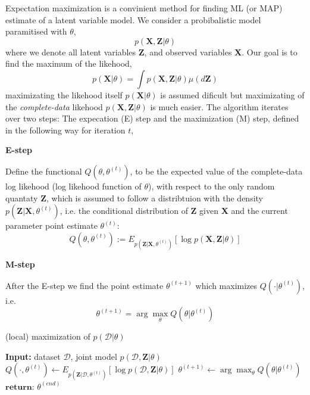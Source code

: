 \begin{testexample2}
    Expectation maximization is a convinient method for finding ML (or MAP) estimate of a 
    latent variable model. We consider a probibalistic model paramitised with $\theta$, 
    $$p(\textbf{X}, \textbf{Z}|\theta)$$ where we denote all latent variables \textbf{Z}, and
    observed variables \textbf{X}. Our goal is to find the maximum of the likehood, 
    $$p(\textbf{X}|\theta) = \int p(\textbf{X}, \textbf{Z}| \theta) \mu(d\textbf{Z})$$
    maximizating the likehood itself $p(\textbf{X}|\theta)$ is assumed dificult 
    but maximizating of the \textit{complete-data} likehood $p(\textbf{X}, \textbf{Z}|\theta)$
    is much easier. The algorithm iterates over two steps: The expecation (E) step and the maximization (M) step, 
    defined in the following way for iteration $t$, 
    
    \textbf{E-step}

    Define the functional $Q(\theta,\theta^{(t)})$, to be the expected value of the complete-data 
    log likehood (log likehood function of $\theta$), with respect to the only random quantaty $\textbf{Z}$,
    which is assumed to follow a distribtuion with the density $p(\textbf{Z}|\textbf{X}, \theta^{(t)})$,
    i.e. the conditional distribution of \textbf{Z} given \textbf{X} and the current parameter point estimate
    $\theta^{(t)}$: 
    $$Q(\theta,\theta^{(t)}) := E_{p(\textbf{Z}|\textbf{X}, \theta^{(t)})}[\log p(\textbf{X}, \textbf{Z}|\theta)]$$

    \textbf{M-step}

    After the E-step we find the point estimate $\theta^{(t+1)}$ which maximizes $Q(\cdot|\theta^{(t)})$, i.e.
    $$\theta^{(t+1)} = \arg\max_{\theta} Q(\theta|\theta^{(t)})$$

    \begin{algorithm}[H]
        \caption*{(local) maximization of $p(\mathcal{D}|\theta)$}\label{EM}
        \begin{algorithmic}
        \State \textbf{Input:} dataset $\mathcal{D}$, joint model $p(\mathcal{D}, \textbf{Z}|\theta)$
            \State $Q(\cdot, \theta^{(t)}) \gets E_{p(\textbf{Z}|\mathcal{D}, \theta^{(t)})}[\log p(\mathcal{D}, \textbf{Z}|\theta)]$ 
            \State $\theta^{(t+1)} \gets \arg\max_{\theta} Q(\theta|\theta^{(t)})$ 
        \EndWhile
        \State $\textbf{return: } \theta^{(end)}$
    \end{algorithmic}
    \end{algorithm}


\end{testexample2}
